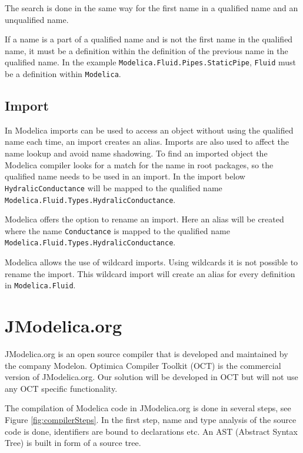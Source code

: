 \documentclass{cslthse-msc}
\begin{document}
The search is done in the same way for the first name in a qualified name and an unqualified name.

If a name is a part of a qualified name and is not the first name in the qualified name, it must be a definition within the definition of the previous name in the qualified name. In the example \texttt{Modelica.Fluid.Pipes.StaticPipe}, \texttt{Fluid} must be a definition within \texttt{Modelica}.

\subsection{Import}
In Modelica imports can be used to access an object without using the qualified name each time, an import creates an alias. Imports are also used to affect the name lookup and avoid name shadowing. To find an imported object the Modelica compiler looks for a match for the name in root packages, so the qualified name needs to be used in an import. In the import below \texttt{HydralicConductance} will be mapped to the qualified name \texttt{Modelica.Fluid.Types.HydralicConductance}.



Modelica offers the option to rename an import. Here an alias will be created where the name \texttt{Conductance} is mapped to the qualified name \texttt{Modelica.Fluid.Types.HydralicConductance}.



Modelica allows the use of wildcard imports. Using wildcards it is not possible to rename the import. This wildcard import will create an alias for every definition in \texttt{Modelica.Fluid}.



\section{JModelica.org}
JModelica.org is an open source compiler that is developed and maintained by the company Modelon. Optimica Compiler Toolkit (OCT) is the commercial version of JModelica.org. Our solution will be developed in OCT but will not use any OCT specific functionality. 

The compilation of Modelica code in JModelica.org is done in several steps, see Figure \ref{fig:compilerSteps}. \cite{aakesson2010implementation} In the first step, name and type analysis of the source code is done, identifiers are bound to declarations etc. An AST (Abstract Syntax Tree) is built in form of a source tree.
\end{document}
